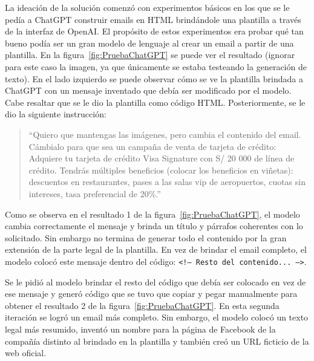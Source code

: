 La ideación de la solución comenzó con experimentos básicos en los que se le pedía a ChatGPT construir emails en HTML brindándole una plantilla a través de la interfaz de OpenAI. El propósito de estos experimentos era probar qué tan bueno podía ser un gran modelo de lenguaje al crear un email a partir de una plantilla. En la figura~\ref{fig:PruebaChatGPT} se puede ver el resultado (ignorar para este caso la imagen, ya que únicamente se estaba testeando la generación de texto). En el lado izquierdo se puede observar cómo se ve la plantilla brindada a ChatGPT con un mensaje inventado que debía ser modificado por el modelo. Cabe resaltar que se le dio la plantilla como código HTML. Posteriormente, se le dio la siguiente instrucción:

\begin{quote}
``Quiero que mantengas las imágenes, pero cambia el contenido del email. Cámbialo para que sea un campaña de venta de tarjeta de crédito: Adquiere tu tarjeta de crédito Visa Signature con S/ 20 000 de línea de crédito. Tendrás múltiples beneficios (colocar los beneficios en viñetas): descuentos en restaurantes, pases a las salas vip de aeropuertos, cuotas sin intereses, tasa preferencial de 20\%.''
\end{quote}

Como se observa en el resultado 1 de la figura~\ref{fig:PruebaChatGPT}, el modelo cambia correctamente el mensaje y brinda un título y párrafos coherentes con lo solicitado. Sin embargo no termina de generar todo el contenido por la gran extensión de la parte legal de la plantilla. En vez de brindar el email completo, el modelo colocó este mensaje dentro del código: \texttt{<!-- Resto del contenido... -->}. 

Se le pidió al modelo brindar el resto del código que debía ser colocado en vez de ese mensaje y generó código que se tuvo que copiar y pegar manualmente para obtener el resultado 2 de la figura~\ref{fig:PruebaChatGPT}. En esta segunda iteración se logró un email más completo. Sin embargo, el modelo colocó un texto legal más resumido, inventó un nombre para la página de Facebook de la compañía distinto al brindado en la plantilla y también creó un URL ficticio de la web oficial.


